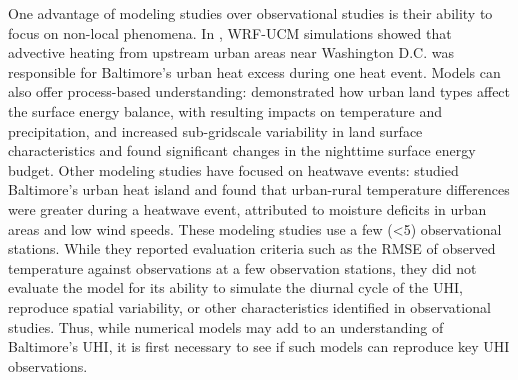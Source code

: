 \documentclass[draft,linenumbers]{agujournal}
\begin{document}
One advantage of 
modeling studies over observational studies is their ability to focus on non-local phenomena.
In
\cite{zhang2011impact}, WRF-UCM simulations showed that advective heating from upstream urban areas near Washington D.C. was responsible for Baltimore's urban heat excess during one heat event. 
Models can also offer process-based understanding: \cite{li2013modeling} demonstrated how urban land types affect the surface energy balance, with resulting impacts on temperature and precipitation, and \cite{li2013development} increased sub-gridscale variability in land surface characteristics and found significant changes in the nighttime surface energy budget. 
Other modeling studies have focused on heatwave events: \cite{li2013synergistic} studied Baltimore's urban heat island and found that urban-rural temperature differences were greater during a heatwave event, attributed to moisture deficits in urban areas and low wind speeds. 
These modeling studies use a few (<5) observational stations. While they reported evaluation criteria such as the RMSE of observed temperature against observations at a few observation stations, they did not evaluate the model for its ability to simulate the diurnal cycle of the UHI, reproduce spatial variability, or other characteristics identified in observational studies. Thus, while numerical models may add to an understanding of Baltimore's UHI, it is first necessary to see if such models can reproduce key UHI observations.
\end{document}
